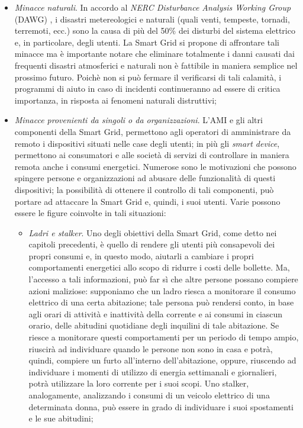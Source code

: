 \begin{itemize}
\item \textit{Minacce naturali}. In accordo al \textit{NERC Disturbance Analysis Working Group} (DAWG) \cite{securingSG}, i disastri metereologici e naturali (quali venti, tempeste, tornadi, terremoti, ecc.) sono la causa di più del 50\% dei disturbi del sistema elettrico e, in particolare, degli utenti. La Smart Grid si propone di affrontare tali minacce ma è importante notare che eliminare totalmente i danni causati dai frequenti disastri atmosferici e naturali non è fattibile in maniera semplice nel prossimo futuro. Poichè non si può fermare il verificarsi di tali calamità, i programmi di aiuto in caso di incidenti continueranno ad essere di critica importanza, in risposta ai fenomeni naturali distruttivi;
\item \textit{Minacce provenienti da singoli o da organizzazioni}. L'AMI e gli altri componenti della Smart Grid, permettono agli operatori di amministrare da remoto i dispositivi situati nelle case degli utenti; in più gli \textit{smart device}, permettono ai consumatori e alle società di servizi di controllare in maniera remota anche i consumi energetici. Numerose sono le motivazioni che possono spingere persone e organizzazioni ad abusare delle funzionalità di questi dispositivi; la possibilità di ottenere il controllo di tali componenti, può portare ad attaccare la Smart Grid e, quindi, i suoi utenti. Varie possono essere le figure coinvolte in tali situazioni:
	\begin{itemize}
	\item \textit{Ladri e stalker}. Uno degli obiettivi della Smart Grid, come detto nei capitoli precedenti, è quello di rendere gli utenti più consapevoli dei propri consumi e, in questo modo, aiutarli a cambiare i propri comportamenti energetici allo scopo di ridurre i costi delle bollette. Ma, l'accesso a tali informazioni, può far sì che altre persone possano compiere azioni maliziose: supponiamo che un ladro riesca a monitorare il consumo elettrico di una certa abitazione; tale persona può rendersi conto, in base agli orari di attività e inattività della corrente e ai consumi in ciascun orario, delle abitudini quotidiane degli inquilini di tale abitazione. Se riesce a monitorare questi comportamenti per un periodo di tempo ampio, riuscirà ad individuare quando le persone non sono in casa e potrà, quindi, compiere un furto all'interno dell'abitazione, oppure, riuscendo ad individuare i momenti di utilizzo di energia settimanali e giornalieri, potrà utilizzare la loro corrente per i suoi scopi. Uno stalker, analogamente, analizzando i consumi di un veicolo elettrico di una determinata donna, può essere in grado di individuare i suoi spostamenti e le sue abitudini;

\end{itemize}
\end{itemize}
